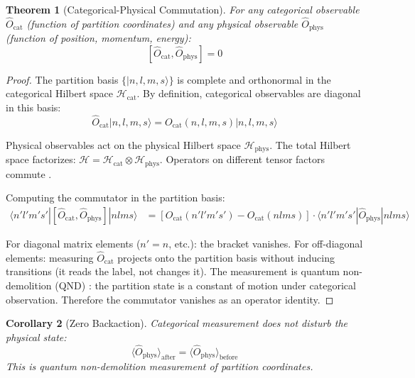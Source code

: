 \documentclass[11pt,twocolumn,a4paper]{article}
\newtheorem{theorem}{Theorem}[section]
\newtheorem{corollary}[theorem]{Corollary}
\theoremstyle{definition}
\theoremstyle{remark}
\newcommand{\Hilbert}{\mathcal{H}}
\begin{document}
\begin{theorem}[Categorical-Physical Commutation]
\label{thm:commutation}
For any categorical observable $\hat{O}_{\mathrm{cat}}$ (function of partition coordinates) and any physical observable $\hat{O}_{\mathrm{phys}}$ (function of position, momentum, energy):
\begin{equation}
\boxed{[\hat{O}_{\mathrm{cat}}, \hat{O}_{\mathrm{phys}}] = 0}
\label{eq:commutation}
\end{equation}
\end{theorem}

\begin{proof}
The partition basis $\{|n, l, m, s\rangle\}$ is complete and orthonormal in the categorical Hilbert space $\Hilbert_{\mathrm{cat}}$. By definition, categorical observables are diagonal in this basis:
\begin{equation}
\hat{O}_{\mathrm{cat}} |n, l, m, s\rangle = O_{\mathrm{cat}}(n, l, m, s) |n, l, m, s\rangle
\end{equation}

Physical observables act on the physical Hilbert space $\Hilbert_{\mathrm{phys}}$. The total Hilbert space factorizes: $\Hilbert = \Hilbert_{\mathrm{cat}} \otimes \Hilbert_{\mathrm{phys}}$. Operators on different tensor factors commute \citep{sakurai2017}.

Computing the commutator in the partition basis:
\begin{align}
\langle n'l'm's' | [\hat{O}_{\mathrm{cat}}, \hat{O}_{\mathrm{phys}}] | nlms \rangle &= [O_{\mathrm{cat}}(n'l'm's') - O_{\mathrm{cat}}(nlms)] \cdot \langle n'l'm's' | \hat{O}_{\mathrm{phys}} | nlms \rangle
\end{align}

For diagonal matrix elements ($n' = n$, etc.): the bracket vanishes. For off-diagonal elements: measuring $\hat{O}_{\mathrm{cat}}$ projects onto the partition basis without inducing transitions (it reads the label, not changes it). The measurement is quantum non-demolition (QND) \citep{braginsky1980, caves1980}: the partition state is a constant of motion under categorical observation. Therefore the commutator vanishes as an operator identity.
\end{proof}

\begin{corollary}[Zero Backaction]
\label{cor:backaction}
Categorical measurement does not disturb the physical state:
\begin{equation}
\langle \hat{O}_{\mathrm{phys}} \rangle_{\mathrm{after}} = \langle \hat{O}_{\mathrm{phys}} \rangle_{\mathrm{before}}
\end{equation}
This is quantum non-demolition measurement of partition coordinates.
\end{corollary}
\end{document}
